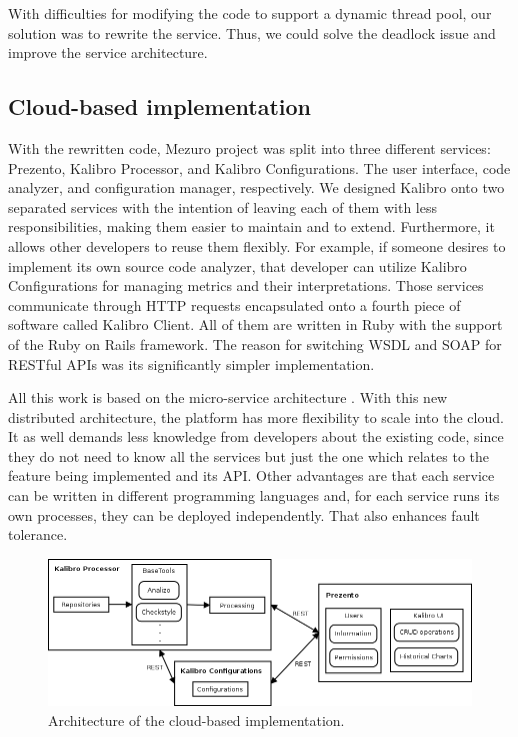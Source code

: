 With difficulties for modifying the code to support a dynamic thread pool, our
solution was to rewrite the service. Thus, we could solve the deadlock issue
and improve the service architecture.

\subsection{Cloud-based implementation}
\label{subsec:cloud-based-implementation}

With the rewritten code, Mezuro project was split into three different
services: Prezento, Kalibro Processor, and Kalibro Configurations. The user
interface, code analyzer, and configuration manager, respectively. We designed
Kalibro onto two separated services with the intention of leaving each of them
with less responsibilities, making them easier to maintain and to extend.
Furthermore, it allows other developers to reuse them flexibly. For example, if
someone desires to implement its own source code analyzer, that developer can
utilize Kalibro Configurations for managing metrics and their interpretations.
Those services communicate through HTTP requests encapsulated onto a fourth
piece of software called Kalibro Client.  All of them are written in Ruby with
the support of the Ruby on Rails framework. The reason for switching WSDL and
SOAP for RESTful APIs was its significantly simpler implementation.

All this work is based on the micro-service architecture
\cite{namiot2014micro}. With this new distributed architecture, the platform has
more flexibility to scale into the cloud. It as well demands less knowledge
from developers about the existing code, since they do not need to know all the
services but just the one which relates to the feature being implemented and
its API. Other advantages are that each service can be written in different
programming languages and, for each service runs its own processes, they can be
deployed independently. That also enhances fault tolerance.

\begin{figure}[htb]
  \centering
  \includegraphics[width=.85\textwidth]{images/mezuro-cloud-arch.png}
  \caption{Architecture of the cloud-based implementation.}
  \label{fig:mezuro-cloud-arch}
\end{figure}

